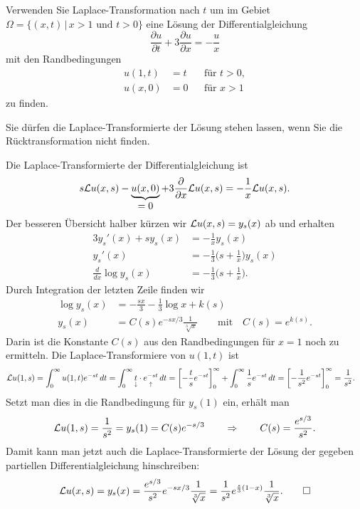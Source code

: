 Verwenden Sie Laplace-Transformation nach $t$ um
im Gebiet $\Omega=\{(x,t)\,|\, x > 1 \text{ und } t > 0\}$ eine
Lösung der Differentialgleichung
\begin{equation}
\frac{\partial u}{\partial t} +3\frac{\partial u}{\partial x} = -\frac{u}{x}
\label{50000012:dgl}
\end{equation}
mit den Randbedingungen
\begin{equation}
\begin{aligned}
u(1,t)&=t& &\text{für $t>0$},\\
u(x,0)&=0& &\text{für $x > 1$}
\end{aligned}
\label{50000012:rb}
\end{equation}
zu finden.

\begin{hinweis}
Sie dürfen die Laplace-Transformierte der Lösung stehen lassen, wenn Sie
die Rücktransformation nicht finden.
\end{hinweis}

\begin{loesung}
Die Laplace-Transformierte der Differentialgleichung ist
\[
s{\cal L}u(x,s) - \underbrace{u(x,0)}_{\displaystyle =0}
+ 3\frac{\partial }{\partial x}{\cal L}u(x,s)
=
-\frac1x{\cal L}u(x,s).
\]
Der besseren Übersicht halber kürzen wir ${\cal L}u(x,s)=y_s(x)$ ab
und erhalten
\begin{align*}
3y_s'(x) + sy_s(x) &= -\frac1x y_s(x)
\\
y_s'(x)&=-\frac13\biggl(s+\frac1x\biggr) y_s(x)
\\
\frac{d}{dx} \log y_s(x) &= -\frac13\biggl(s+\frac1x\biggr).
\end{align*}
Durch Integration der letzten Zeile finden wir
\begin{align*}
\log y_s(x) &= -\frac{sx}{3}-\frac13\log x + k(s)
\\
y_s(x) &= C(s) e^{-sx/3}\frac1{\sqrt[3]{x}}\qquad\text{mit}\quad C(s)=e^{k(s)}.
\end{align*}
Darin ist die Konstante $C(s)$ aus den Randbedingungen für $x=1$
noch zu ermitteln.
Die Laplace-Transformiere von $u(1,t)$ ist
\begin{align*}
{\cal L}u(1,s)
&=
\int_0^\infty u(1,t)e^{-st}\,dt
=
\int_0^\infty \underset{\downarrow}{t}\cdot\underset{\uparrow}{e^{-st}}\,dt
=
\biggl[-\frac{t}se^{-st}\biggr]_0^\infty
+\int_0^\infty \frac1s e^{-st}\,dt
=
\biggl[ -\frac1{s^2}e^{-st}\biggr]_0^\infty=\frac1{s^2}.
\end{align*}
Setzt man dies in die Randbedingung für $y_s(1)$ ein, erhält man
\[
{\cal L}u(1,s) = \frac1{s^2} = y_s(1)=C(s) e^{-s/3}
\qquad
\Rightarrow
\qquad
C(s) = \frac{e^{s/3}}{s^2}.
\]
Damit kann man jetzt auch die Laplace-Transformierte der Lösung der gegeben
partiellen Differentialgleichung hinschreiben:
\[
{\cal L}u(x,s)
=
y_s(x)
=
\frac{e^{s/3}}{s^2}e^{-sx/3}\frac1{\sqrt[3]{x}}
=
\frac1{s^2}e^{\frac{s}3(1-x)}\frac1{\sqrt[3]{x}}.
\qedhere
\]
\end{loesung}

